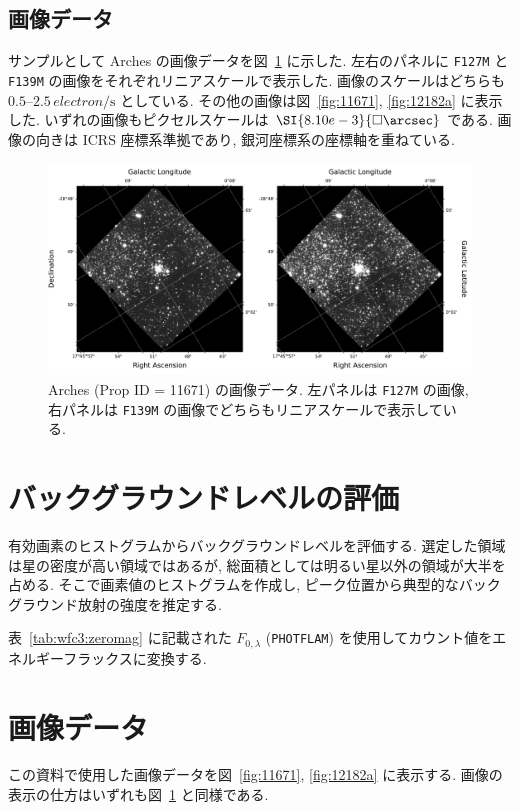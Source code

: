 \documentclass[10pt,a4paper,dvipdfmx,uplatex]{jsarticle}
\begin{document}
\subsection{画像データ}
サンプルとして Arches の画像データを図~\ref{fig:11671:arches} に示した. 左右のパネルに \texttt{F127M} と \texttt{F139M} の画像をそれぞれリニアスケールで表示した. 画像のスケールはどちらも $\numrange{0.5}{2.5}\,\unit{electron\per\second}$ としている. その他の画像は図~\ref{fig:11671}, \ref{fig:12182a} に表示した. いずれの画像もピクセルスケールは $\SI{8.10e-3}{\square\arcsec}$ である. 画像の向きは ICRS 座標系準拠であり, 銀河座標系の座標軸を重ねている.

\begin{figure}
  \centering
  \includegraphics[width=\linewidth]{img/hst_11671_04_wfc3_ir_f127m_drz.pdf}
  \caption{Arches (Prop ID = 11671) の画像データ. 左パネルは \texttt{F127M} の画像, 右パネルは \texttt{F139M} の画像でどちらもリニアスケールで表示している.}
  \label{fig:11671:arches}
\end{figure}

\section{バックグラウンドレベルの評価}
有効画素のヒストグラムからバックグラウンドレベルを評価する. 選定した領域は星の密度が高い領域ではあるが, 総面積としては明るい星以外の領域が大半を占める. そこで画素値のヒストグラムを作成し, ピーク位置から典型的なバックグラウンド放射の強度を推定する.

表~\ref{tab:wfc3:zeromag} に記載された $F_{0,\lambda}$ (\texttt{PHOTFLAM}) を使用してカウント値をエネルギーフラックスに変換する.

\appendix
\section{画像データ}
この資料で使用した画像データを図~\ref{fig:11671}, \ref{fig:12182a} に表示する. 画像の表示の仕方はいずれも図~\ref{fig:11671:arches} と同様である.
\end{document}
